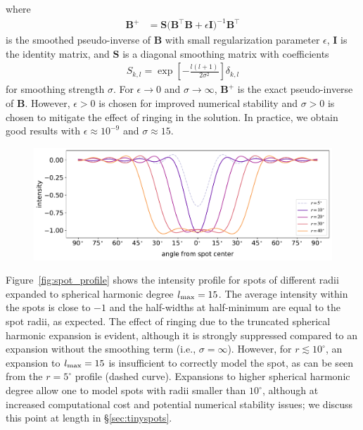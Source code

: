 \documentclass[modern]{aastex62}
\begin{document}
%
%
where
%
\begin{align}
    \mathbf{B}^+ & = \mathbf{S} \Big(\mathbf{B}^\top \mathbf{B} +
    \epsilon \mathbf{I}\Big)^{-1} \mathbf{B}^\top
\end{align}
%
is the smoothed pseudo-inverse of $\mathbf{B}$ with small regularization
parameter $\epsilon$, $\mathbf{I}$ is the identity matrix, and
$\mathbf{S}$ is a diagonal smoothing matrix with coefficients
%
\begin{align}
    S_{k,l} = \exp\left[-\frac{l(l + 1)}{2\sigma^2}\right] \delta_{k,l}
\end{align}
%
for smoothing strength $\sigma$. For $\epsilon \rightarrow 0$ and
$\sigma \rightarrow \infty$,
$\mathbf{B}^+$ is the exact pseudo-inverse of
$\mathbf{B}$. However,
$\epsilon > 0$ is chosen for improved numerical stability and
$\sigma > 0$ is chosen to mitigate the effect of ringing in the solution.
In practice, we obtain good results with $\epsilon \approx 10^{-9}$
and $\sigma \approx 15$.

\begin{figure}[t!]
    \begin{centering}
        \includegraphics[width=\linewidth]{figures/spot_profile.pdf}
    \end{centering}
\end{figure}

Figure~\ref{fig:spot_profile} shows the intensity profile for spots of
different radii expanded to spherical harmonic degree $l_{\mathrm{max}} = 15$.
The average intensity
within the spots is close to $-1$ and the half-widths at half-minimum are
equal to the spot radii, as expected.
The effect of ringing due to the truncated spherical harmonic expansion is
evident, although it is strongly suppressed compared to an expansion
without the smoothing term (i.e., $\sigma = \infty$). However, for
$r \lesssim 10^\circ$, an expansion to $l_{\mathrm{max}} = 15$ is
insufficient to correctly model the spot, as can be seen from the
$r = 5^\circ$ profile (dashed curve). Expansions to higher spherical harmonic
degree allow one to model spots with radii smaller than $10^\circ$, although
at increased computational cost and potential numerical stability issues;
we discuss this point at length in \S\ref{sec:tinyspots}.
\end{document}
